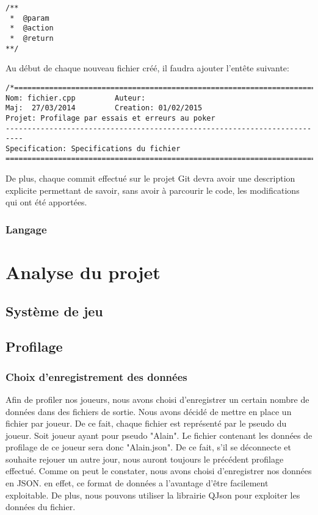 \documentclass{report}
\begin{document}
\begin{lstlisting}
/**
 *  @param
 *  @action
 *  @return
**/
\end{lstlisting}

Au début de chaque nouveau fichier créé, il faudra ajouter l'entête suivante: 
\begin{lstlisting}
/*========================================================================
Nom: fichier.cpp         Auteur: 
Maj:  27/03/2014         Creation: 01/02/2015
Projet: Profilage par essais et erreurs au poker
--------------------------------------------------------------------------
Specification: Specifications du fichier
=========================================================================*/
\end{lstlisting}

De plus, chaque commit effectué sur le projet Git devra avoir une description explicite permettant de savoir, sans avoir à parcourir le code, les modifications qui ont été apportées.\par

\subsection{Langage}

\chapter{Analyse du projet}

\section{Système de jeu}

\section{Profilage}
\subsection{Choix d'enregistrement des données}

Afin de profiler nos joueurs, nous avons choisi d'enregistrer un certain nombre de données dans des fichiers de sortie. Nous avons décidé de mettre en place un fichier par joueur. De ce fait, chaque fichier est représenté par le pseudo du joueur. Soit joueur ayant pour pseudo "Alain". Le fichier contenant les données de profilage de ce joueur sera donc "Alain.json". De ce fait, s'il se déconnecte et souhaite rejouer un autre jour, nous auront toujours le précédent profilage effectué.
Comme on peut le constater, nous avons choisi d'enregistrer nos données en JSON. en effet, ce format de données a l'avantage d'être facilement exploitable. De plus, nous pouvons utiliser la librairie QJson pour exploiter les données du fichier.
\end{document}
